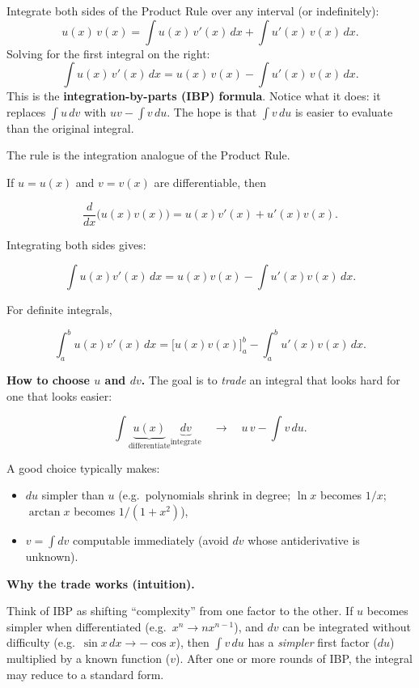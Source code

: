 Integrate both sides of the Product Rule over any interval (or indefinitely):
\[
u(x)\,v(x) = \int u(x)\,v'(x)\,dx + \int u'(x)\,v(x)\,dx.
\]
Solving for the first integral on the right:
\[
\int u(x)\,v'(x)\,dx = u(x)\,v(x) - \int u'(x)\,v(x)\,dx.
\]
This is the \textbf{integration-by-parts (IBP) formula}. Notice what it does: it replaces $\int u\,dv$ with $uv - \int v\,du$. The hope is that $\int v\,du$ is easier to evaluate than the original integral.

\begin{keyformula}[title={Key Formula: Integration by Parts (Indefinite and Definite)}]

The rule is the integration analogue of the Product Rule.

If $u=u(x)$ and $v=v(x)$ are differentiable, then

\[
\frac{d}{dx}\big(u(x)v(x)\big)=u(x)v'(x)+u'(x)v(x).
\]

Integrating both sides gives:

\[
\int u(x)v'(x)\,dx = u(x)v(x) - \int u'(x)v(x)\,dx.
\]

For definite integrals,

\[
\int_a^b u(x)v'(x)\,dx = \big[u(x)v(x)\big]_a^b - \int_a^b u'(x)v(x)\,dx.
\]

\end{keyformula}

\noindent
\textbf{How to choose $u$ and $dv$.}
The goal is to \emph{trade} an integral that looks hard for one that looks easier:

\[
\int \underbrace{u(x)}_{\text{differentiate}} \underbrace{dv}_{\text{integrate}}
\quad\longrightarrow\quad
u\,v - \int v\,du.
\]

A good choice typically makes:

\begin{itemize}
\item $du$ simpler than $u$ (e.g.\ polynomials shrink in degree; $\ln x$ becomes $1/x$; $\arctan x$ becomes $1/(1+x^2)$),
\item $v=\int dv$ computable immediately (avoid $dv$ whose antiderivative is unknown).
\end{itemize}

\textbf{Why the trade works (intuition).}

Think of IBP as shifting ``complexity'' from one factor to the other. If $u$ becomes simpler when differentiated (e.g.\ $x^n \to nx^{n-1}$), and $dv$ can be integrated without difficulty (e.g.\ $\sin x\,dx \to -\cos x$), then $\int v\,du$ has a \emph{simpler} first factor ($du$) multiplied by a known function ($v$). After one or more rounds of IBP, the integral may reduce to a standard form.

